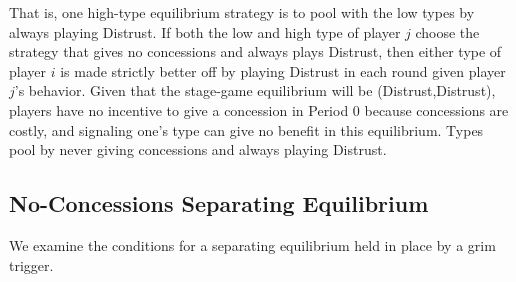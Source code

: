 \documentclass[bibtex,autowc]{apsr_submission}
\begin{document}
That is, one high-type equilibrium strategy is to pool with the low types by always playing Distrust. If both the low and high type of player $j$ choose the strategy that gives no concessions and always plays Distrust, then either type of player $i$ is made strictly better off by playing Distrust in each round given player $j$'s behavior. Given that the stage-game equilibrium will be (Distrust,Distrust), players have no incentive to give a concession in Period 0 because concessions are costly, and signaling one's type can give no benefit in this equilibrium. Types pool by never giving concessions and always playing Distrust. 
 
\subsection{No-Concessions Separating Equilibrium}
 
 We examine the conditions for a separating equilibrium held in place by a grim trigger.
 
\end{document}
